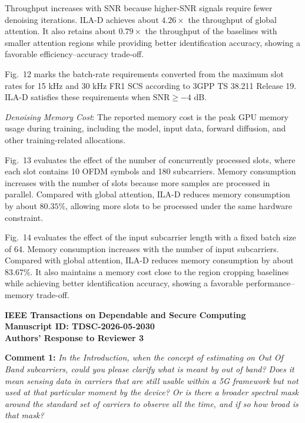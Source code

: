 \documentclass[onecolumn,11pt]{article}
\newcommand{\secc}[2]{\mySep \noindent \textsf{\textbf{#1 }}\noindent \textit{#2}}
\newcommand{\mySep}{\vspace{8pt}}
\begin{document}
{{Throughput increases with SNR because higher-SNR signals require fewer denoising iterations. 
ILA-D achieves about $4.26\times$ the throughput of global attention. 
It also retains about $0.79\times$ the throughput of the baselines with smaller attention regions while providing better identification accuracy, showing a favorable efficiency--accuracy trade-off.

Fig.~12 marks the batch-rate requirements converted from the maximum slot rates for 15 kHz and 30 kHz FR1 SCS according to 3GPP TS 38.211 Release 19. 
ILA-D satisfies these requirements when $\mathrm{SNR}\geq -4$ dB.

\textit{Denoising Memory Cost}: The reported memory cost is the peak GPU memory usage during training, including the model, input data, forward diffusion, and other training-related allocations.

Fig.~13 evaluates the effect of the number of concurrently processed slots, where each slot contains 10 OFDM symbols and 180 subcarriers. 
Memory consumption increases with the number of slots because more samples are processed in parallel. 
Compared with global attention, ILA-D reduces memory consumption by about $80.35\%$, allowing more slots to be processed under the same hardware constraint.

Fig.~14 evaluates the effect of the input subcarrier length with a fixed batch size of 64. 
Memory consumption increases with the number of input subcarriers.
Compared with global attention, ILA-D reduces memory consumption by about $83.67\%$. 
It also maintains a memory cost close to the region cropping baselines while achieving better identification accuracy, showing a favorable performance--memory trade-off.
}
}

\clearpage


\begin{center}
\textbf{\Large{IEEE Transactions on Dependable and Secure Computing\\
Manuscript ID: TDSC-2026-05-2030 \\
\vspace{0.3cm} Authors' Response to Reviewer 3}}
\end{center}

\secc{Comment 1:}{In the Introduction, when the concept of estimating on Out Of Band subcarriers, could you please clarify what is meant by out of band? Does it mean sensing data in carriers that are still usable within a 5G framework but not used at that particular moment by the device? Or is there a broader spectral mask around the standard set of carriers to observe all the time, and if so how broad is that mask?
}
\end{document}
